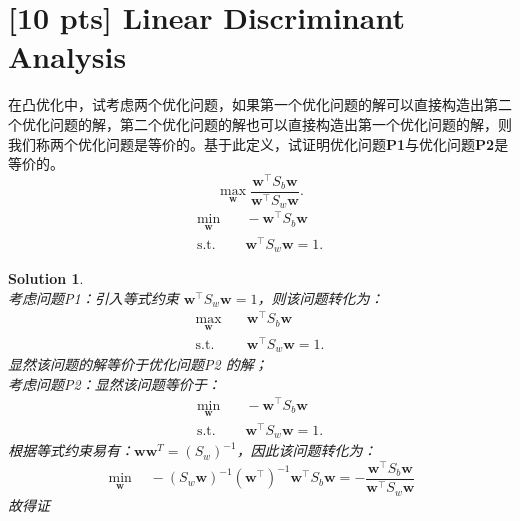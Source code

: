 \documentclass[a4paper,UTF8]{article}
\numberwithin{equation}{section}
\newtheorem*{solution}{Solution}
\begin{document}
\section{[10 pts] Linear Discriminant Analysis}
在凸优化中，试考虑两个优化问题，如果第一个优化问题的解可以直接构造出第二个优化问题的解，第二个优化问题的解也可以直接构造出第一个优化问题的解，则我们称两个优化问题是等价的。基于此定义，试证明优化问题\textbf{P1}与优化问题\textbf{P2}是等价的。
\begin{equation}
	\label{P1}
	\max_{\mathbf{w}} \frac{\mathbf{w}^\top S_b \mathbf{w}}{\mathbf{w}^\top S_w \mathbf{w}} . 
\end{equation}
\begin{equation}
	\label{P2}
	\begin{aligned}
		\min_{\mathbf{w}} & \quad -\mathbf{w}^\top S_b \mathbf{w} \\ 
		\text{s.t.} & \quad \mathbf{w}^\top S_w \mathbf{w} = 1 . 
	\end{aligned}
\end{equation}

\begin{solution}
~\\考虑问题\textsc{P1}：引入等式约束 $\mathbf{w}^\top S_w \mathbf{w} = 1$，则该问题转化为：
	\begin{equation}\nonumber		
	\begin{aligned}
		\max_\mathbf{w} & \quad \mathbf{w}^\top S_b \mathbf{w}\\
		\text{s.t.} & \quad \mathbf{w}^\top S_w \mathbf{w} = 1 . 	
	\end{aligned}
	\end{equation}
显然该问题的解等价于优化问题\textsc{P2} 的解；
~\\考虑问题\textsc{P2}：显然该问题等价于：
	\begin{equation}\nonumber		
	\begin{aligned}
		\min_{\mathbf{w}} & \quad -\mathbf{w}^\top S_b \mathbf{w} \\ 
		\text{s.t.} & \quad \mathbf{w}^\top S_w \mathbf{w} = 1 . 
	\end{aligned}
	\end{equation} 
根据等式约束易有：$\mathbf{ww}^T = (S_w)^{-1}$，因此该问题转化为：
	\begin{equation}\nonumber
	\min_{\mathbf{w}} \quad - (S_w\mathbf{w})^{-1} (\mathbf{w}^\top)^{-1}\mathbf{w}^\top S_b \mathbf{w} = - \frac{\mathbf{w}^\top S_b \mathbf{w}}{\mathbf{w}^\top S_w\mathbf{w}}	
	\end{equation}
	故得证
\end{solution}
\end{document}
